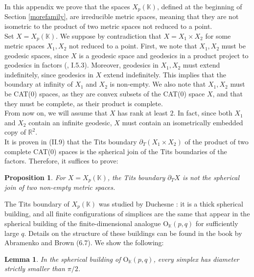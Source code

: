 \documentclass{article}
\theoremstyle{definition}
\theoremstyle{remark}
\theoremstyle{plain}
\newtheorem{prp}[dfn]{Proposition}
\newtheorem{lem}[dfn]{Lemma}
\begin{document}
In this appendix we prove that the spaces $X_p(\mathbb{K})$, defined at the beginning of Section \ref{morefamily}, are irreducible metric spaces, meaning that they are not isometric to the product of two metric spaces not reduced to a point. \\

Set $X=X_p(\mathbb{K})$. We suppose by contradiction that $X=X_1\times X_2$ for some metric spaces $X_1,X_2$ not reduced to a point. First, we note that $X_1,X_2$ must be geodesic spaces, since $X$ is a geodesic space and geodesics in a product project to geodesics in factors (\cite{bh}, I.5.3). Moreover, geodesics in $X_1,X_2$ must extend indefinitely, since geodesics in $X$ extend indefinitely. This implies that the boundary at infinity of $X_1$ and $X_2$ is non-empty. We also note that $X_1,X_2$ must be CAT(0) spaces, as they are convex subsets of the CAT(0) space $X$, and that they must be complete, as their product is complete. \\

From now on, we will assume that $X$ has rank at least $2$. In fact, since both $X_1$ and $X_2$ contain an infinite geodesic, $X$ must contain an isometrically embedded copy of $\mathbb{R}^2$. \\

It is proven in \cite{bh} (II.9) that the Tits boundary $\partial_T(X_1\times X_2)$ of the product of two complete CAT(0) spaces is the spherical join of the Tits boundaries of the factors. Therefore, it suffices to prove:

\begin{prp} \label{nojoin}
    For $X=X_p(\mathbb{K})$, the Tits boundary $\partial_T X$ is not the spherical join of two non-empty metric spaces. \\
\end{prp}

The Tits boundary of $X_p(\mathbb{K})$ was studied by Duchesne \cite{duc2013}: it is a thick spherical building, and all finite configurations of simplices are the same that appear in the spherical building of the finite-dimensional analogue $\mathrm{O}_\mathbb{K}(p,q)$ for sufficiently large $q$. Details on the structure of these buildings can be found in the book by Abramenko and Brown \cite{buildings} (6.7). We show the following:

\begin{lem}
    In the spherical building of $\mathrm{O}_\mathbb{K}(p,q)$, every simplex has diameter strictly smaller than $\pi/2$.
\end{lem}
\end{document}
